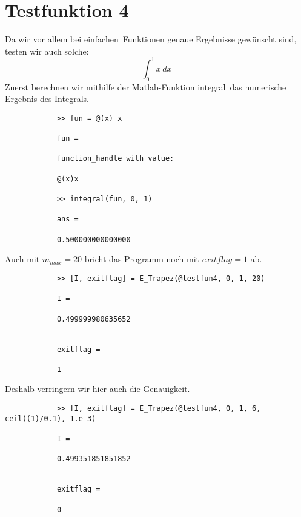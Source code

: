 \documentclass[11pt,titlepage]{article}
\begin{document}
	\section{Testfunktion 4}
		Da wir vor allem bei \glqq einfachen\grqq \, Funktionen genaue Ergebnisse gewünscht sind, testen wir auch solche:
		\begin{displaymath}
			\int_{0}^1 x \, dx\
		\end{displaymath}
		Zuerst berechnen wir mithilfe der Matlab-Funktion \glqq integral\grqq \, das numerische Ergebnis des Integrals.
		\begin{lstlisting}
			>> fun = @(x) x
			
			fun =
			
			function_handle with value:
			
			@(x)x
			
			>> integral(fun, 0, 1)
			
			ans =
			
			0.500000000000000
		\end{lstlisting}
		Auch mit $m_{max} = 20$ bricht das Programm noch mit $exitflag = 1$ ab.
		\begin{lstlisting}
			>> [I, exitflag] = E_Trapez(@testfun4, 0, 1, 20)
			
			I =
			
			0.499999980635652
			
			
			exitflag =
			
			1
		\end{lstlisting}
		Deshalb verringern wir hier auch die Genauigkeit.
		\begin{lstlisting}
			>> [I, exitflag] = E_Trapez(@testfun4, 0, 1, 6, ceil((1)/0.1), 1.e-3)
			
			I =
			
			0.499351851851852
			
			
			exitflag =
			
			0
		\end{lstlisting}
\end{document}
